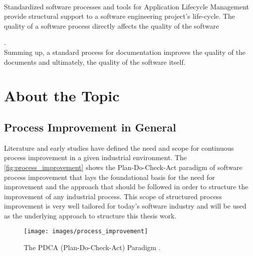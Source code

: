 \\\indent Standardized software processes and tools for Application Lifecycle Management provide structural support to a software engineering project's life-cycle. The quality of a software process directly affects the quality of the software {\cite{Fuggeffa1988}.
\\\indent Summing up, a standard process for documentation improves the quality of the documents and ultimately, the quality of the software itself.

\section{About the Topic}\label{sec:about}
\subsection{Process Improvement in General}
Literature and early studies have defined the need and scope for continuous process improvement in a given industrial environment.
\newline\indent The \autoref{fig:process_improvement} shows the Plan-Do-Check-Act paradigm of software process improvement that lays the foundational basis for the need for improvement and the approach that should be followed in order to structure the improvement of any industrial process. This scope of structured process improvement is very well tailored for today's software industry and will be used as the underlying approach to structure this thesis work.

\begin{figure}[H]
  \centering
  \texttt{[image: images/process\_improvement]}
  \caption[The PDCA (Plan-Do-Check-Act) Paradigm /cite{Gorschek2006}]{The PDCA (Plan-Do-Check-Act) Paradigm \cite{Gorschek2006}.}\label{fig:process_improvement}
\end{figure}

}
